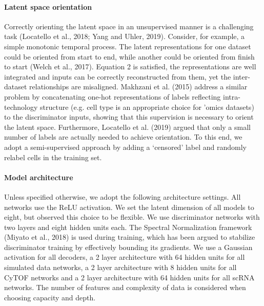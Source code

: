 \paragraph{Latent space orientation}
Correctly orienting the latent space in an unsupervised manner is a challenging task (Locatello et al., 2018; Yang and Uhler, 2019).
Consider, for example, a simple monotonic temporal process.
The latent representations for one dataset could be oriented from start to end, while another could be oriented from finish to start (Welch et al., 2017).
Equation 2 is satisfied, the representations are well integrated and inputs can be correctly reconstructed from them, yet the inter-dataset relationships are misaligned.
Makhzani et al. (2015) address a similar problem by concatenating one-hot representations of labels reflecting intra-technology structure (e.g. cell type is an appropriate choice for ’omics datasets) to the discriminator inputs, showing that this supervision is necessary to orient the latent space.
Furthermore, Locatello et al. (2019) argued that only a small number of labels are actually needed to achieve orientation.
To this end, we adopt a semi-supervised approach by adding a ‘censored’ label and randomly relabel cells in the training set.

\paragraph{Model architecture}
Unless specified otherwise, we adopt the following architecture settings.
All networks use the ReLU activation. %
We set the latent dimension of all models to eight, but observed this choice to be flexible.
We use discriminator networks with two layers and eight hidden units each.
The Spectral Normalization framework (Miyato et al., 2018) is used during training, which has been argued to stabilize discriminator training by effectively bounding its gradients.
We use a Gaussian activation for all decoders, a 2 layer architecture with 64 hidden units for all simulated data networks, a 2 layer architecture with 8 hidden units for all CyTOF networks and a 2 layer architecture with 64 hidden units for all scRNA networks.
The number of features and complexity of data is considered when choosing capacity and depth.

